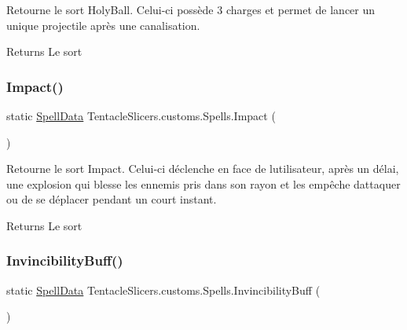 Retourne le sort Holy\+Ball. Celui-\/ci possède 3 charges et permet de lancer un unique projectile après une canalisation. 

\begin{DoxyReturn}{Returns}
Le sort 
\end{DoxyReturn}
\mbox{\label{class_tentacle_slicers_1_1customs_1_1_spells_a2e91e950b16b11c0d613b3a011a4cbf8}} 
\subsubsection{\texorpdfstring{Impact()}{Impact()}}
{\footnotesize\ttfamily static \hyperlink{class_tentacle_slicers_1_1spells_1_1_spell_data}{Spell\+Data} Tentacle\+Slicers.\+customs.\+Spells.\+Impact (\begin{DoxyParamCaption}{ }\end{DoxyParamCaption})\hspace{0.3cm}{\ttfamily [static]}}



Retourne le sort Impact. Celui-\/ci déclenche en face de l\textquotesingle{}utilisateur, après un délai, une explosion qui blesse les ennemis pris dans son rayon et les empêche d\textquotesingle{}attaquer ou de se déplacer pendant un court instant. 

\begin{DoxyReturn}{Returns}
Le sort 
\end{DoxyReturn}
\mbox{\label{class_tentacle_slicers_1_1customs_1_1_spells_ac42105a2f08364e32cfd41e3caaff07b}} 
\subsubsection{\texorpdfstring{Invincibility\+Buff()}{InvincibilityBuff()}}
{\footnotesize\ttfamily static \hyperlink{class_tentacle_slicers_1_1spells_1_1_spell_data}{Spell\+Data} Tentacle\+Slicers.\+customs.\+Spells.\+Invincibility\+Buff (\begin{DoxyParamCaption}{ }\end{DoxyParamCaption})\hspace{0.3cm}{\ttfamily [static]}}



